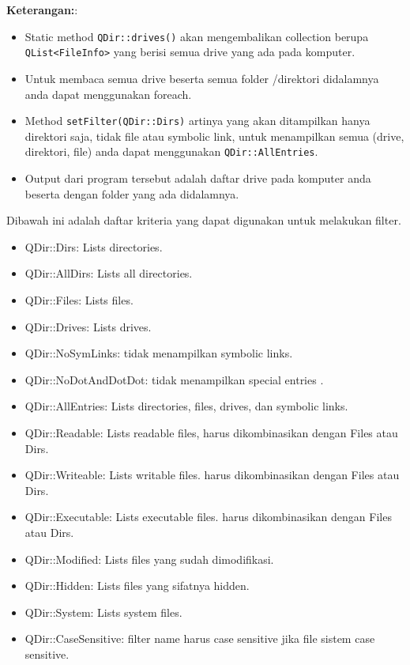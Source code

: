 \textbf{Keterangan:}:

\begin{itemize}
\tightlist
\item
  Static method \texttt{QDir::drives()} akan mengembalikan collection
  berupa \texttt{QList\textless{}FileInfo\textgreater{}} yang berisi
  semua drive yang ada pada komputer.
\item
  Untuk membaca semua drive beserta semua folder /direktori didalamnya
  anda dapat menggunakan foreach.
\item
  Method \texttt{setFilter(QDir::Dirs)} artinya yang akan ditampilkan
  hanya direktori saja, tidak file atau symbolic link, untuk menampilkan
  semua (drive, direktori, file) anda dapat menggunakan
  \texttt{QDir::AllEntries}.
\item
  Output dari program tersebut adalah daftar drive pada komputer anda
  beserta dengan folder yang ada didalamnya.
\end{itemize}

Dibawah ini adalah daftar kriteria yang dapat digunakan untuk melakukan
filter.

\begin{itemize}
\tightlist
\item
  QDir::Dirs: Lists directories.
\item
  QDir::AllDirs: Lists all directories.
\item
  QDir::Files: Lists files.
\item
  QDir::Drives: Lists drives.
\item
  QDir::NoSymLinks: tidak menampilkan symbolic links.
\item
  QDir::NoDotAndDotDot: tidak menampilkan special entries .
\item
  QDir::AllEntries: Lists directories, files, drives, dan symbolic
  links.
\item
  QDir::Readable: Lists readable files, harus dikombinasikan dengan
  Files atau Dirs.
\item
  QDir::Writeable: Lists writable files. harus dikombinasikan dengan
  Files atau Dirs.
\item
  QDir::Executable: Lists executable files. harus dikombinasikan dengan
  Files atau Dirs.
\item
  QDir::Modified: Lists files yang sudah dimodifikasi.
\item
  QDir::Hidden: Lists files yang sifatnya hidden.
\item
  QDir::System: Lists system files.
\item
  QDir::CaseSensitive: filter name harus case sensitive jika file sistem
  case sensitive.
\end{itemize}

